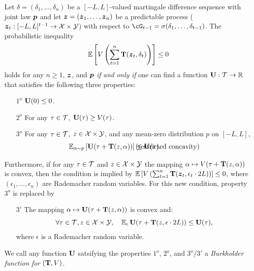\begin{lemma}
	\label{lem:equivalence_burkholder}
Let $\delta=(\delta_1,\ldots,\delta_n)$ be a $[-L,L]$-valued martingale difference sequence with joint law $\boldsymbol{p}$ and let $\boldsymbol{z}=(\boldsymbol{z}_1,\ldots,\boldsymbol{z}_n)$ be a predictable process ($\boldsymbol{z}_t: [-L,L]^{t-1} \to \mathcal{X} \times \mathcal{Y}$) with respect to $\cG_{t-1}=\sigma(\delta_1,\ldots,\delta_{t-1})$. The probabilistic inequality 
\begin{align}
	\label{eq:martingale_nonpositive}
	\operatorname{\mathbb{E}}\left[  V\left(\sum_{t=1}^n \mathbf{T}(\boldsymbol{z}_t,\delta_t)\right) \right] \le 0
\end{align}
holds for any $n\geq 1$, $\boldsymbol{z}$, and $\boldsymbol{p}$ \emph{if and only if} one can find a function $\mathbf{U}:\mathcal{T}\to{\mathbb R}$ that satisfies the following three properties:
\begin{enumerate}
 \item[$1^o$] $\mathbf{U}(0) \le 0$.
 \item[$2^o$] For any $\tau \in \mathcal{T}$, $\mathbf{U}(\tau) \ge V(\tau)$.
 \item[$3^o$] For any $\tau \in \mathcal{T}$, $z \in \mathcal{X} \times \mathcal{Y}$, and any mean-zero distribution $p$ on $[-L,L]$, 
 \begin{align}
 \En_{\alpha\sim p}\left[\burk(\tau + \suff(z,\alpha))\right] \le \burk(\tau). \hspace{-20mm} \tag{restricted concavity}
 \end{align}
\end{enumerate}
Furthermore, if for any $\tau \in \mathcal{T}$ and $z \in \mathcal{X} \times \mathcal{Y}$ the mapping $\alpha \mapsto V(\tau + \mathbf{T}(z,\alpha))$ is convex, then the condition  is implied by $\operatorname{\mathbb{E}}\left[  V\left(\sum_{t=1}^n \mathbf{T}(\boldsymbol{z}_t,\epsilon_t\cdot{}2L)\right) \right] \le 0$, where $(\epsilon_1,\ldots,\epsilon_n)$ are Rademacher random variables. For this new condition, property $3^o$ is replaced by
\begin{enumerate}
 \item[$3'$] The mapping $\alpha \mapsto \mathbf{U}(\tau + \mathbf{T}(z,\alpha))$ is convex and:
 $$
 \forall \tau \in \mathcal{T}, z \in \mathcal{X} \times \mathcal{Y},~~~ \operatorname{\mathbb{E}}_\epsilon \mathbf{U}(\tau + \mathbf{T}(z,\epsilon \cdot{}2L))  \le \mathbf{U}(\tau),
 $$
 where $\epsilon$ is a Rademacher random variable. 
\end{enumerate}
\end{lemma}

\begin{definition}
We call any function $\mathbf{U}$ satsifying the properties $1^o$, $2^o$, and $3^o$/$3'$ a \emph{Burkholder function for $(\mathbf{T},V)$}.
\end{definition}

